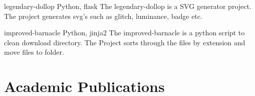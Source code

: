 \documentclass[fontsize=11pt]{tccv}
\begin{document}
\vspace{1em}
\begin{project}
	\item{ legendary-dollop}
	{Python, flask}
	{The legendary-dollop is a SVG generator project. The project generates svg's such as glitch, luminance, badge etc.}\\
\end{project}	
\vspace{1em}

\vspace{1em}
\begin{project}
	\item{ improved-barnacle}
	{Python, jinja2}
	{The improved-barnacle is a python script to clean download directory. The Project sorts through the files by extension and move files to folder.}\\
\end{project}	
\vspace{1em}

\section{Academic Publications}
\end{document}
